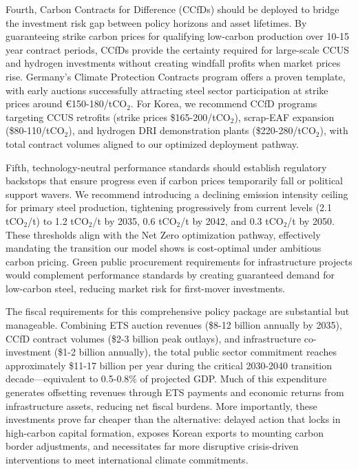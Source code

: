 \documentclass[preprint,1p,authoryear]{elsarticle}
\begin{document}
Fourth, Carbon Contracts for Difference (CCfDs) should be deployed to bridge the investment risk gap between policy horizons and asset lifetimes. By guaranteeing strike carbon prices for qualifying low-carbon production over 10-15 year contract periods, CCfDs provide the certainty required for large-scale CCUS and hydrogen investments without creating windfall profits when market prices rise. Germany's Climate Protection Contracts program offers a proven template, with early auctions successfully attracting steel sector participation at strike prices around €150-180/tCO$_2$. For Korea, we recommend CCfD programs targeting CCUS retrofits (strike prices \$165-200/tCO$_2$), scrap-EAF expansion (\$80-110/tCO$_2$), and hydrogen DRI demonstration plants (\$220-280/tCO$_2$), with total contract volumes aligned to our optimized deployment pathway.

Fifth, technology-neutral performance standards should establish regulatory backstops that ensure progress even if carbon prices temporarily fall or political support wavers. We recommend introducing a declining emission intensity ceiling for primary steel production, tightening progressively from current levels (2.1 tCO$_2$/t) to 1.2 tCO$_2$/t by 2035, 0.6 tCO$_2$/t by 2042, and 0.3 tCO$_2$/t by 2050. These thresholds align with the Net Zero optimization pathway, effectively mandating the transition our model shows is cost-optimal under ambitious carbon pricing. Green public procurement requirements for infrastructure projects would complement performance standards by creating guaranteed demand for low-carbon steel, reducing market risk for first-mover investments.

The fiscal requirements for this comprehensive policy package are substantial but manageable. Combining ETS auction revenues (\$8-12 billion annually by 2035), CCfD contract volumes (\$2-3 billion peak outlays), and infrastructure co-investment (\$1-2 billion annually), the total public sector commitment reaches approximately \$11-17 billion per year during the critical 2030-2040 transition decade—equivalent to 0.5-0.8\% of projected GDP. Much of this expenditure generates offsetting revenues through ETS payments and economic returns from infrastructure assets, reducing net fiscal burdens. More importantly, these investments prove far cheaper than the alternative: delayed action that locks in high-carbon capital formation, exposes Korean exports to mounting carbon border adjustments, and necessitates far more disruptive crisis-driven interventions to meet international climate commitments.
\end{document}
